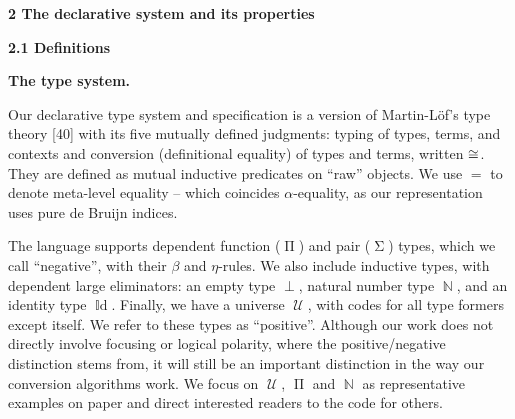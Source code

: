
 
\par\medskip\noindent\textbf{2 The declarative system and its properties}\par
 
 
\par\medskip\noindent\textbf{2.1 Definitions}\par
 
 
\par\medskip\noindent\textbf{The type system.}\par
 
 
Our declarative type system and specification is a version of Martin-Löf’s type theory [40] with its five mutually defined judgments: typing of types, terms, and contexts and conversion (definitional equality) of types and terms, written $\mathrel{\raisebox{-0.5pt}{$\cong$}}$. They are defined as mutual inductive predicates on “raw” objects. We use $=$ to denote meta-level equality – which coincides $\alpha$-equality, as our representation uses pure de Bruijn indices.\par
 
 
 
The language supports dependent function ($\operatorname{\Pi}$) and pair ($\operatorname{\Sigma}$) types, which we call “negative”, with their $\beta$ and $\eta$-rules. We also include inductive types, with dependent large eliminators: an empty type $\operatorname{\bot}$, natural number type $\operatorname{\mathbb{N}}$, and an identity type $\operatorname{\mathbb{I}d}$. Finally, we have a universe $\operatorname{\mathcal{U}}$, with codes for all type formers except itself. We refer to these types as “positive”. Although our work does not directly involve focusing or logical polarity, where the positive/negative distinction stems from, it will still be an important distinction in the way our conversion algorithms work. We focus on $\operatorname{\mathcal{U}}$, $\operatorname{\Pi}$ and $\operatorname{\mathbb{N}}$ as representative examples on paper and direct interested readers to the code for others.\par
 
 
 
